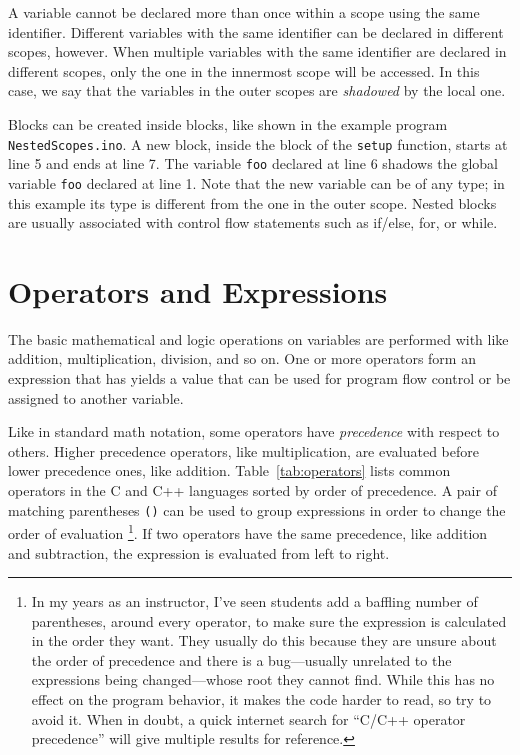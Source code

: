 
A variable cannot be declared more than once within a scope using the same identifier.
Different variables with the same identifier can be declared in different scopes, however.
When multiple variables with the same identifier are declared in different scopes, only the one in the innermost scope will be accessed.
In this case, we say that the variables in the outer scopes are \emph{shadowed} by the local one.

Blocks can be created inside blocks, like shown in the example program \texttt{NestedScopes.ino}.
A new block, inside the block of the \texttt{setup} function, starts at line 5 and ends at line 7.
The variable \texttt{foo} declared at line 6 shadows the global variable \texttt{foo} declared at line 1.
Note that the new variable can be of any type; in this example its type is different from the one in the outer scope.
Nested blocks are usually associated with control flow statements such as if/else, for, or while.


\section{Operators and Expressions}
The basic mathematical and logic operations on variables are performed with  like addition, multiplication, division, and so on.
One or more operators form an expression that has yields a value that can be used for program flow control or be assigned to another variable.

Like in standard math notation, some operators have \emph{precedence} with respect to others.
Higher precedence operators, like multiplication, are evaluated before lower precedence ones, like addition.
Table~\ref{tab:operators} lists common operators in the C and C++ languages sorted by order of precedence.
A pair of matching parentheses \texttt{()} can be used to group expressions in order to change the order of evaluation%
\footnote{%
  In my years as an instructor, I've seen students add a baffling number of parentheses, around every operator, to make sure the expression is calculated in the order they want.
  They usually do this because they are unsure about the order of precedence and there is a bug---usually unrelated to the expressions being changed---whose root they cannot find.
  While this has no effect on the program behavior, it makes the code harder to read, so try to avoid it.
  When in doubt, a quick internet search for ``C/C++ operator precedence'' will give multiple results for reference.
}.
If two operators have the same precedence, like addition and subtraction, the expression is evaluated from left to right.

